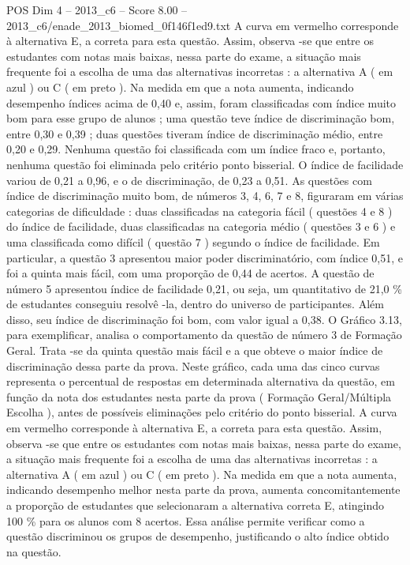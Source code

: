 \begin{textsample}{POS Dim 4 – 2013\_c6 – Score 8.00 – 2013\_c6/enade\_2013\_biomed\_0f146f1ed9.txt}
A curva em vermelho corresponde à alternativa E, a correta para esta questão.
Assim, observa -se que entre os estudantes com notas mais baixas, nessa parte do exame, a situação mais frequente foi a escolha de uma das alternativas incorretas : a alternativa A ( em azul ) ou C ( em preto ).
Na medida em que a nota aumenta, indicando desempenho índices acima de 0,40 e, assim, foram classificadas com índice muito bom para esse grupo de alunos ; uma questão teve índice de discriminação bom, entre 0,30 e 0,39 ; duas questões tiveram índice de discriminação médio, entre 0,20 e 0,29.
Nenhuma questão foi classificada com um índice fraco e, portanto, nenhuma questão foi eliminada pelo critério ponto bisserial.
O índice de facilidade variou de 0,21 a 0,96, e o de discriminação, de 0,23 a 0,51.
As questões com índice de discriminação muito bom, de números 3, 4, 6, 7 e 8, figuraram em várias categorias de dificuldade : duas classificadas na categoria fácil ( questões 4 e 8 ) do índice de facilidade, duas classificadas na categoria médio ( questões 3 e 6 ) e uma classificada como difícil ( questão 7 ) segundo o índice de facilidade.
Em particular, a questão 3 apresentou maior poder discriminatório, com índice 0,51, e foi a quinta mais fácil, com uma proporção de 0,44 de acertos.
A questão de número 5 apresentou índice de facilidade 0,21, ou seja, um quantitativo de 21,0 \% de estudantes conseguiu resolvê -la, dentro do universo de participantes.
Além disso, seu índice de discriminação foi bom, com valor igual a 0,38.
O Gráfico 3.13, para exemplificar, analisa o comportamento da questão de número 3 de Formação Geral.
Trata -se da quinta questão mais fácil e a que obteve o maior índice de discriminação dessa parte da prova.
Neste gráfico, cada uma das cinco curvas representa o percentual de respostas em determinada alternativa da questão, em função da nota dos estudantes nesta parte da prova ( Formação Geral/Múltipla Escolha ), antes de possíveis eliminações pelo critério do ponto bisserial.
A curva em vermelho corresponde à alternativa E, a correta para esta questão.
Assim, observa -se que entre os estudantes com notas mais baixas, nessa parte do exame, a situação mais frequente foi a escolha de uma das alternativas incorretas : a alternativa A ( em azul ) ou C ( em preto ).
Na medida em que a nota aumenta, indicando desempenho melhor nesta parte da prova, aumenta concomitantemente a proporção de estudantes que selecionaram a alternativa correta E, atingindo 100 \% para os alunos com 8 acertos.
Essa análise permite verificar como a questão discriminou os grupos de desempenho, justificando o alto índice obtido na questão.

\end{textsample}
